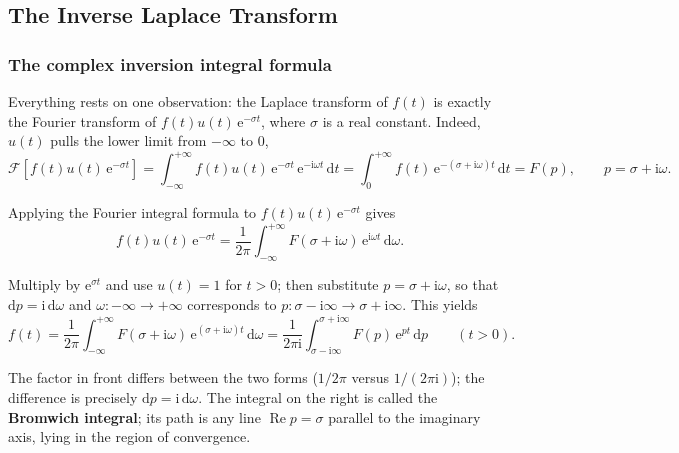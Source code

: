 \documentclass[11pt,a4paper]{article}
\theoremstyle{definition}
\theoremstyle{plain}
\begin{document}
\subsection{The Inverse Laplace Transform}

\subsubsection{The complex inversion integral formula}

Everything rests on one observation: the Laplace transform of $f(t)$ is exactly the Fourier
transform of $f(t)u(t)\,\mathrm{e}^{-\sigma t}$, where $\sigma$ is a real constant. Indeed, $u(t)$
pulls the lower limit from $-\infty$ to $0$,
\begin{equation*}
\mathcal{F}\left[f(t)u(t)\,\mathrm{e}^{-\sigma t}\right]
=\int_{-\infty}^{+\infty}f(t)u(t)\,\mathrm{e}^{-\sigma t}\,\mathrm{e}^{-\mathrm{i}\omega t}\,\mathrm{d}t
=\int_{0}^{+\infty}f(t)\,\mathrm{e}^{-(\sigma+\mathrm{i}\omega)t}\,\mathrm{d}t=F(p),
\qquad p=\sigma+\mathrm{i}\omega .
\end{equation*}

Applying the Fourier integral formula to $f(t)u(t)\,\mathrm{e}^{-\sigma t}$ gives
\begin{equation*}
f(t)u(t)\,\mathrm{e}^{-\sigma t}=\frac{1}{2\pi}\int_{-\infty}^{+\infty}
F(\sigma+\mathrm{i}\omega)\,\mathrm{e}^{\mathrm{i}\omega t}\,\mathrm{d}\omega .
\end{equation*}

Multiply by $\mathrm{e}^{\sigma t}$ and use $u(t)=1$ for $t>0$; then substitute
$p=\sigma+\mathrm{i}\omega$, so that $\mathrm{d}p=\mathrm{i}\,\mathrm{d}\omega$ and
$\omega:-\infty\to+\infty$ corresponds to
$p:\sigma-\mathrm{i}\infty\to\sigma+\mathrm{i}\infty$. This yields
\begin{equation}
f(t)=\frac{1}{2\pi}\int_{-\infty}^{+\infty}F(\sigma+\mathrm{i}\omega)\,
\mathrm{e}^{(\sigma+\mathrm{i}\omega)t}\,\mathrm{d}\omega
=\frac{1}{2\pi\mathrm{i}}\int_{\sigma-\mathrm{i}\infty}^{\sigma+\mathrm{i}\infty}
F(p)\,\mathrm{e}^{pt}\,\mathrm{d}p\qquad(t>0). \tag{5.1}
\end{equation}

The factor in front differs between the two forms ($1/2\pi$ versus $1/(2\pi\mathrm{i})$); the
difference is precisely $\mathrm{d}p=\mathrm{i}\,\mathrm{d}\omega$. The integral on the right is
called the \textbf{Bromwich integral}; its path is any line $\operatorname{Re}p=\sigma$ parallel to
the imaginary axis, lying in the region of convergence.
\end{document}
